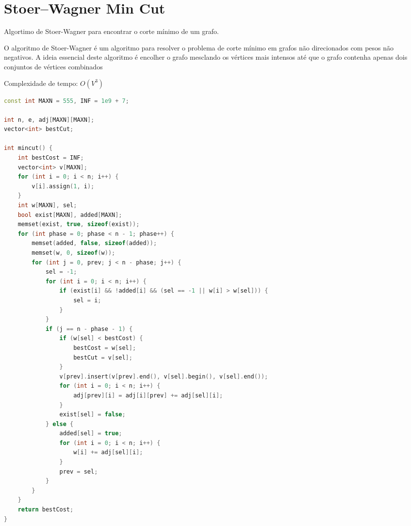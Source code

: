 \documentclass[11pt, a4paper, oneside]{book}
\begin{document}
\hfill

\section{Stoer–Wagner Min Cut}


Algortimo de Stoer-Wagner para encontrar o corte mínimo de um grafo.



O algoritmo de Stoer-Wagner é um algoritmo para resolver o problema de corte mínimo em grafos não direcionados com pesos não negativos. A ideia essencial deste algoritmo é encolher o grafo mesclando os vértices mais intensos até que o grafo contenha apenas dois conjuntos de vértices combinados



Complexidade de tempo: $O(V^3)$

\hfill

\begin{multicols}{2}
\begin{lstlisting}[language=C++]
const int MAXN = 555, INF = 1e9 + 7;

int n, e, adj[MAXN][MAXN];
vector<int> bestCut;

int mincut() {
    int bestCost = INF;
    vector<int> v[MAXN];
    for (int i = 0; i < n; i++) {
        v[i].assign(1, i);
    }
    int w[MAXN], sel;
    bool exist[MAXN], added[MAXN];
    memset(exist, true, sizeof(exist));
    for (int phase = 0; phase < n - 1; phase++) {
        memset(added, false, sizeof(added));
        memset(w, 0, sizeof(w));
        for (int j = 0, prev; j < n - phase; j++) {
            sel = -1;
            for (int i = 0; i < n; i++) {
                if (exist[i] && !added[i] && (sel == -1 || w[i] > w[sel])) {
                    sel = i;
                }
            }
            if (j == n - phase - 1) {
                if (w[sel] < bestCost) {
                    bestCost = w[sel];
                    bestCut = v[sel];
                }
                v[prev].insert(v[prev].end(), v[sel].begin(), v[sel].end());
                for (int i = 0; i < n; i++) {
                    adj[prev][i] = adj[i][prev] += adj[sel][i];
                }
                exist[sel] = false;
            } else {
                added[sel] = true;
                for (int i = 0; i < n; i++) {
                    w[i] += adj[sel][i];
                }
                prev = sel;
            }
        }
    }
    return bestCost;
}\end{lstlisting}
\end{multicols}
\end{document}
